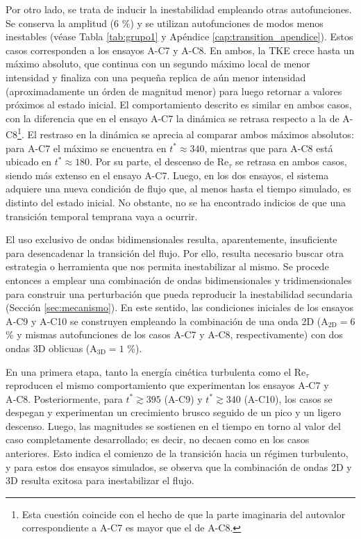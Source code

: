 Por otro lado, se trata de inducir la inestabilidad empleando otras autofunciones. Se conserva la amplitud (6 \%) y se utilizan autofunciones de modos menos inestables (véase Tabla \ref{tab:grupo1} y Apéndice \ref{cap:transition_apendice}). Estos casos corresponden a los ensayos A-C7 y A-C8. En ambos, la TKE crece hasta un máximo absoluto, que continua con un segundo máximo local de menor intensidad y finaliza con una pequeña replica de aún menor intensidad (aproximadamente un órden de magnitud menor) para luego retornar a valores próximos al estado inicial. El comportamiento descrito es similar en ambos casos, con la diferencia que en el ensayo A-C7 la dinámica se retrasa respecto a la de A-C8\footnote{ Esta cuestión coincide con el hecho de que la parte imaginaria del autovalor correspondiente a A-C7 es mayor que el de A-C8.}. El restraso en la dinámica se aprecia al comparar ambos máximos absolutos: para A-C7 el máximo se encuentra en $t^* \approx 340$, mientras que para A-C8 está ubicado en  $t^* \approx 180$. Por su parte, el descenso de Re$_{\tau}$ se retrasa en ambos casos, siendo más extenso en el ensayo A-C7. Luego, en los dos ensayos, el sistema adquiere una nueva condición de flujo que, al menos hasta el tiempo simulado, es distinto del estado inicial. No obstante, no se ha encontrado indicios de que una transición temporal temprana vaya a ocurrir.  

El uso exclusivo de ondas bidimensionales resulta, aparentemente, insuficiente para desencadenar la transición del flujo. Por ello, resulta necesario buscar otra estrategia o herramienta que nos permita inestabilizar al mismo. Se procede entonces a emplear una combinación de ondas bidimensionales y tridimensionales para construir una perturbación que pueda reproducir la inestabilidad secundaria (Sección \ref{sec:mecanismo}). En este sentido, las condiciones iniciales de los ensayos A‑C9 y A‑C10 se construyen empleando la combinación de una onda 2D (A$_\text{2D}=6$ \% y mismas autofunciones de los casos A-C7 y A-C8, respectivamente) con dos ondas 3D oblicuas (A$_\text{3D}=1$ \%). 

En una primera etapa, tanto la energía cinética turbulenta como el Re$_{\tau}$ reproducen el mismo comportamiento que experimentan los ensayos A‑C7 y A‑C8. Posteriormente, para $t^* \gtrsim 395$ (A-C9) y $t^* \gtrsim 340$ (A-C10), los casos se despegan y experimentan un crecimiento brusco seguido de un pico y un ligero descenso. Luego, las magnitudes se sostienen en el tiempo en torno al valor del caso completamente desarrollado; es decir, no decaen como en los casos anteriores. Esto indica el comienzo de la transición hacia un régimen turbulento, y para estos dos ensayos simulados, se observa que la combinación de ondas 2D y 3D resulta exitosa para inestabilizar el flujo. 

